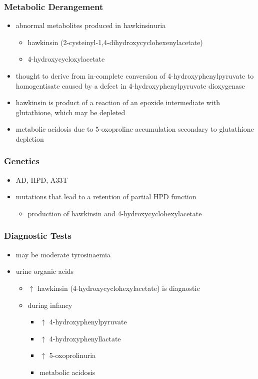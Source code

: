\documentclass{scrartcl}
\begin{document}
\subsubsection{Metabolic Derangement}
\label{sec:org83dfb06}
\begin{itemize}
\item abnormal metabolites produced in hawkinsinuria
\begin{itemize}
\item hawkinsin (2-cysteinyl-1,4-dihydroxycyclohexenylacetate)
\item 4-hydroxycycloxylacetate
\end{itemize}
\item thought to derive from in-complete conversion of
4-hydroxyphenylpyruvate to homogentisate caused by a defect in
4-hydroxyphenylpyruvate dioxygenase
\end{itemize}
\begin{itemize}
\item hawkinsin is product of a reaction of an epoxide intermediate with
glutathione, which may be depleted
\item metabolic acidosis due to 5-oxoproline accumulation secondary to
glutathione depletion
\end{itemize}

\subsubsection{Genetics}
\label{sec:org61eb7ea}
\begin{itemize}
\item AD, HPD, A33T
\item mutations that lead to a retention of partial HPD function
\begin{itemize}
\item production of hawkinsin and 4-hydroxycyclohexylacetate
\end{itemize}
\end{itemize}
\subsubsection{Diagnostic Tests}
\label{sec:orgb40868b}
\begin{itemize}
\item may be moderate tyrosinaemia
\item urine organic acids
\begin{itemize}
\item \(\uparrow\) hawkinsin (4-hydroxycyclohexylacetate) is diagnostic
\item during infancy
\begin{itemize}
\item \(\uparrow\) 4-hydroxyphenylpyruvate
\item \(\uparrow\) 4-hydroxyphenyllactate
\item \(\uparrow\) 5-oxoprolinuria
\item metabolic acidosis
\end{itemize}
\end{itemize}
\end{itemize}
\end{document}
